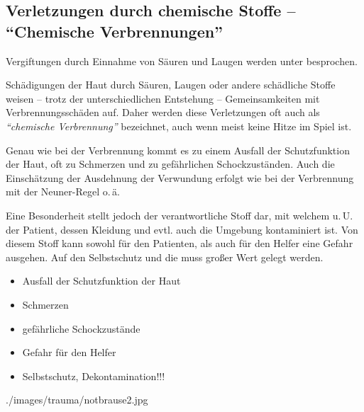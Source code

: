 \clearpage
\subsection{Verletzungen durch chemische Stoffe -- \enquote{Chemische Verbrennungen}}
\label{topic:veraetzung-trauma}

\noindent\dsliterary{} \cite{RD200811Hoffmann}

Vergiftungen durch Einnahme von Säuren und Laugen werden 
unter  besprochen. 

{%
Schädigungen der Haut durch Säuren, Laugen oder andere
schädliche Stoffe weisen -- trotz der unterschiedlichen
Entstehung -- Gemeinsamkeiten mit Verbrennungsschäden auf.
Daher werden diese Verletzungen oft auch als
\emph{\enquote{chemische Verbrennung}} bezeichnet, auch wenn meist
keine Hitze im Spiel ist.

Genau wie bei der Verbrennung kommt es zu einem Ausfall der
Schutzfunktion der Haut, oft zu Schmerzen und zu
gefährlichen Schockzuständen. Auch die Einschätzung der
Ausdehnung der Verwundung erfolgt wie bei der Verbrennung
mit der Neuner-Regel o.\,ä.

Eine Besonderheit stellt jedoch der verantwortliche Stoff
dar, mit welchem u.\,U. der Patient, dessen Kleidung und
evtl. auch die Umgebung kontaminiert ist. Von diesem Stoff
kann sowohl für den Patienten, als auch für den Helfer eine
Gefahr ausgehen. Auf den Selbstschutz und die
 muss großer Wert gelegt werden.
}
{
\begin{itemize}
  \item Ausfall der Schutzfunktion der Haut
  \item Schmerzen
  \item gefährliche Schockzustände
  \item Gefahr für den Helfer
  \item Selbstschutz, Dekontamination!!!
\end{itemize}
}
{./images/trauma/notbrause2.jpg}
{}
{}


